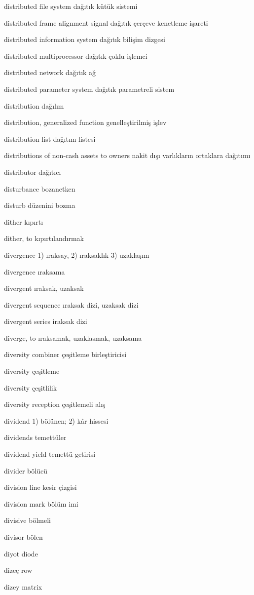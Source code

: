 \documentclass[12pt,fleqn]{article}\usepackage{../../common}
\begin{document}
distributed file system dağıtık kütük sistemi

distributed frame alignment signal dağıtık çerçeve kenetleme işareti

distributed information system dağıtık bilişim dizgesi

distributed multiprocessor dağıtık çoklu işlemci

distributed network dağıtık ağ

distributed parameter system dağıtık parametreli sistem

distribution dağılım

distribution, generalized function genelleştirilmiş işlev

distribution list dağıtım listesi

distributions of non-cash assets to owners nakit dışı varlıkların ortaklara dağıtımı

distributor dağıtıcı

disturbance bozanetken

disturb düzenini bozma

dither kıpırtı

dither, to kıpırtılandırmak

divergence 1) ıraksay, 2) ıraksaklık 3) uzaklaşım

divergence ıraksama

divergent ıraksak, uzaksak

divergent sequence ıraksak dizi, uzaksak dizi

divergent series iraksak dizi

diverge, to ıraksamak, uzaklasmak, uzaksama

diversity combiner çeşitleme birleştiricisi

diversity çeşitleme

diversity çeşitlilik

diversity reception çeşitlemeli alış

dividend 1) bölünen; 2) kâr hissesi

dividends temettüler

dividend yield temettü getirisi

divider bölücü

division line kesir çizgisi

division mark bölüm imi

divisive bölmeli

divisor bölen

diyot diode

dizeç row

dizey matrix
\end{document}
